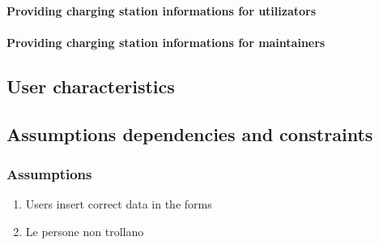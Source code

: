 \paragraph{Providing charging station informations for utilizators}
\paragraph{Providing charging station informations for maintainers}


\subsection{User characteristics}

\subsection{Assumptions dependencies and constraints}
\subsubsection{Assumptions}
\begin{enumerate}[label=A\arabic*]
      \item Users insert correct data in the forms
      \item Le persone non trollano
\end{enumerate}
\clearpage